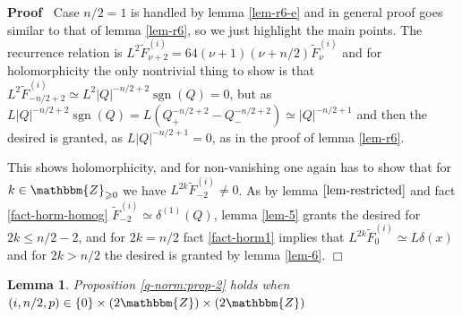 \documentclass{article}
\newcommand{\tmop}[1]{\ensuremath{\operatorname{#1}}}
\newenvironment{proof}{\noindent\textbf{Proof\ }}{\hspace*{\fill}$\Box$\medskip}
\numberwithin{definition}{section}
\newtheorem{lemma}{Lemma}
\numberwithin{lemma}{section}
\numberwithin{proposition}{section}
{\theorembodyfont{\rmfamily}\newtheorem{remark}{Remark}
\numberwithin{remark}{section}
}
\begin{document}
\begin{proof}
  Case $n / 2 = 1$ is handled by lemma \ref{lem-r6-e} and in general proof
  goes similar to that of lemma \ref{lem-r6}, so we just highlight the main
  points. The recurrence relation is $L^2 \tilde{F}^{( i)}_{\nu + 2} = 64 (
  \nu + 1) ( \nu + n / 2) \tilde{F}_{\nu}^{( i)}$ and for holomorphicity the
  only nontrivial thing to show is that $L^2 \tilde{F}_{- n / 2 + 2}^{( i)}
  \simeq L^2 | Q |^{- n / 2 + 2} \tmop{sgn} ( Q) = 0$, but as $L | Q |^{- n /
  2 + 2} \tmop{sgn} ( Q) = L ( Q_+^{- n / 2 + 2} - Q_-^{- n / 2 + 2}) \simeq |
  Q |^{- n / 2 + 1}$ and then the desired is granted, as $L | Q |^{- n / 2 +
  1} = 0$, as in the proof of lemma \ref{lem-r6}.
  
  This shows holomorphicity, and for non-vanishing one again has to show that
  for $k \in \mathbbm{Z}_{\geqslant 0}$ we have $L^{2 k} \tilde{F}^{( i)}_{-
  2} \neq 0$. As by lemma $\ref{lem-restricted}$ and fact
  \ref{fact-horm-homog} $\tilde{F}^{( i)}_{- 2} \simeq \delta^{( 1)} ( Q)$,
  lemma \ref{lem-5} grants the desired for $2 k \leqslant n / 2 - 2$, and for
  $2 k = n / 2$ fact \ref{fact-horm1} implies that $L^{2 k} \tilde{F}_0^{( i)}
  \simeq L \delta ( x)$ and for $2 k > n / 2$ the desired is granted by lemma
  \ref{lem-6}.
\end{proof}

\begin{lemma}
  \label{lem-r1}Proposition \ref{q-norm:prop-2} holds when $( i, n / 2, p) \in
  \{ 0 \} \times ( 2\mathbbm{Z}) \times ( 2\mathbbm{Z})$
\end{lemma}
\end{document}
